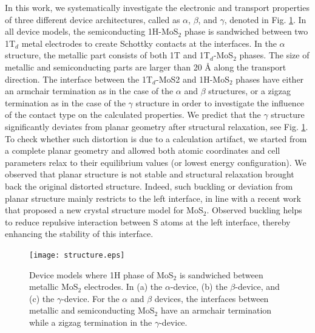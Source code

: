 In this work, we systematically investigate the electronic and transport properties of three different device architectures, called as $\alpha$, $\beta$, and $\gamma$, denoted in Fig. \ref{structure-1t}.  In all device models, the semiconducting 1H-MoS$_2$ phase is sandwiched between two 1T$_d$ metal electrodes to create Schottky contacts at the interfaces. In the $\alpha$ structure, the metallic part consists of both 1T and 1T$_d$-MoS$_2$ phases. The size of metallic and semiconducting parts are larger than 20 {\AA} along the transport direction. The interface between the 1T$_d$-MoS2 and 1H-MoS$_2$ phases have either an armchair termination as in the case of   the $\alpha$ and $\beta$ structures, or a zigzag termination as in the case of the $\gamma$ structure in order to investigate the influence of the contact type on the calculated properties. We predict that the $\gamma$ structure significantly deviates from planar geometry after structural relaxation, see Fig. \ref{structure-1t}. To check whether such distortion is due to a calculation artifact, we started from a complete planar geometry and allowed both atomic coordinates and cell parameters relax to their equilibrium values (or lowest energy configuration). We observed that planar structure is not stable and structural relaxation brought back the original distorted structure. Indeed, such buckling or deviation from planar structure mainly restricts to the left interface, in line with a recent work that proposed a new crystal structure model for MoS$_2$\cite{C5NR07715J}.  Observed buckling helps to reduce repulsive interaction between S atoms at the left interface, thereby enhancing the stability of this interface.  

\begin{figure}[htb]
\centering
\texttt{[image: structure.eps]}%
\caption{\label{structure-1t}  Device models where 1H phase of MoS$_2$ is sandwiched between metallic MoS$_2$ electrodes. In (a) the $\alpha$-device, (b) the $\beta$-device, and (c)
the $\gamma$-device. For the $\alpha$ and $\beta$ devices, 
the interfaces between metallic and semiconducting MoS$_2$ have an armchair termination while a zigzag termination in the $\gamma$-device. }
\end{figure}


